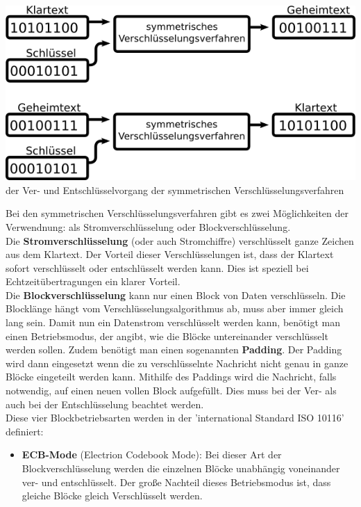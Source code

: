 \documentclass[12pt,a4paper]{report}
\begin{document}
\begin{onehalfspace}
\begin{center}
\includegraphics[scale=3]{img/sym.png}\\
der Ver- und Entschlüsselvorgang der symmetrischen Verschlüsselungsverfahren
\end{center}

Bei den symmetrischen Verschlüsselungsverfahren gibt es zwei Möglichkeiten der Verwendnung: als Stromverschlüsselung oder Blockverschlüsselung.\\
Die \textbf{Stromverschlüsselung} (oder auch Stromchiffre) verschlüsselt ganze Zeichen aus dem Klartext. Der Vorteil dieser Verschlüsselungen ist, dass der Klartext sofort verschlüsselt oder entschlüsselt werden kann. Dies ist speziell bei Echtzeitübertragungen ein klarer Vorteil.\\
Die \textbf{Blockverschlüsselung} kann nur einen Block von Daten verschlüsseln. Die Blocklänge hängt vom Verschlüsselungsalgorithmus ab, muss aber immer gleich lang sein. Damit nun ein Datenstrom verschlüsselt werden kann, benötigt man einen Betriebsmodus, der angibt, wie die Blöcke untereinander verschlüsselt werden sollen. Zudem benötigt man einen sogenannten \textbf{Padding}. Der Padding wird dann eingesetzt wenn die zu verschlüsselnte Nachricht nicht genau in ganze Blöcke eingeteilt werden kann. Mithilfe des Paddings wird die Nachricht, falls notwendig, auf einen neuen vollen Block aufgefüllt. Dies muss bei der Ver- als auch bei der Entschlüsselung beachtet werden.\\

Diese vier Blockbetriebsarten werden in der 'international Standard ISO 10116' definiert:

\begin{itemize}
\item \textbf{ECB-Mode} (Electrion Codebook Mode): Bei dieser Art der Blockverschlüsselung werden die einzelnen Blöcke unabhängig voneinander ver- und entschlüsselt. Der große Nachteil dieses Betriebsmodus ist, dass gleiche Blöcke gleich Verschlüsselt werden.


\end{itemize}
\end{onehalfspace}
\end{document}
